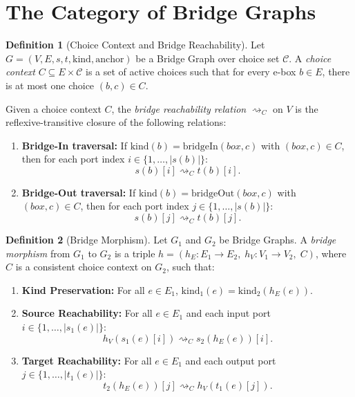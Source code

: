 \documentclass[11pt,a4paper]{article}
\theoremstyle{definition}
\newtheorem{definition}{Definition}[section]
\theoremstyle{plain}
\begin{document}
\section{The Category of Bridge Graphs}

\begin{definition}[Choice Context and Bridge Reachability]
Let $G = (V, E, s, t, \mathrm{kind}, \mathrm{anchor})$ be a Bridge Graph over choice set $\mathcal{C}$. 
A \emph{choice context} $C \subseteq E \times \mathcal{C}$ is a set of active choices such that for every e-box $b \in E$, there is at most one choice $(b, c) \in C$.

Given a choice context $C$, the \emph{bridge reachability relation} $\rightsquigarrow_C$ on $V$ is the reflexive-transitive closure of the following relations:
\begin{enumerate}
    \item \textbf{Bridge-In traversal:} If $\mathrm{kind}(b) = \mathrm{bridgeIn}(box, c)$ with $(box, c) \in C$, then for each port index $i \in \{1, \dots, |s(b)|\}$:
    \[
    s(b)[i] \rightsquigarrow_C t(b)[i].
    \]
    \item \textbf{Bridge-Out traversal:} If $\mathrm{kind}(b) = \mathrm{bridgeOut}(box, c)$ with $(box, c) \in C$, then for each port index $j \in \{1, \dots, |s(b)|\}$:
    \[
    s(b)[j] \rightsquigarrow_C t(b)[j].
    \]
\end{enumerate}
\end{definition}

\begin{definition}[Bridge Morphism]
Let $G_1$ and $G_2$ be Bridge Graphs. A \emph{bridge morphism} from $G_1$ to $G_2$ is a triple $h = (h_E \colon E_1 \to E_2, \; h_V \colon V_1 \to V_2, \; C)$, where $C$ is a consistent choice context on $G_2$, such that:
\begin{enumerate}[label=(\alph*)]
    \item \textbf{Kind Preservation:} For all $e \in E_1$, $\mathrm{kind}_1(e) = \mathrm{kind}_2(h_E(e))$.
    \item \textbf{Source Reachability:} For all $e \in E_1$ and each input port $i \in \{1, \dots, |s_1(e)|\}$:
    \[
    h_V(s_1(e)[i]) \rightsquigarrow_C s_2(h_E(e))[i].
    \]
    \item \textbf{Target Reachability:} For all $e \in E_1$ and each output port $j \in \{1, \dots, |t_1(e)|\}$:
    \[
    t_2(h_E(e))[j] \rightsquigarrow_C h_V(t_1(e)[j]).
    \]
\end{enumerate}
\end{definition}
\end{document}
